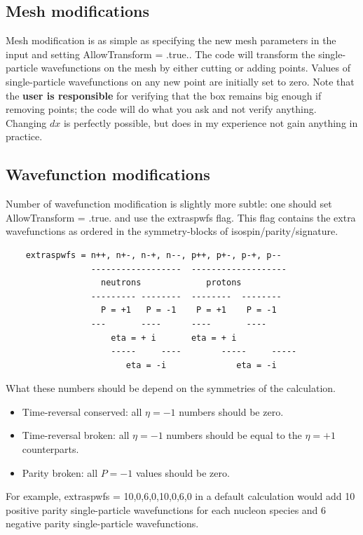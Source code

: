 \documentclass[print,amsmath,amssymb,aps,prc,nofootinbib,notitlepage]{revtex4-1}
\begin{document}
\subsection{Mesh modifications}

  Mesh modification is as simple as specifying the new mesh parameters in the
  input and setting  \textsf{AllowTransform = .true.}. The code will 
  transform the single-particle wavefunctions on the mesh by either cutting 
  or adding points. Values of single-particle wavefunctions on any new point are 
  initially set to zero. Note that the \textbf{user is responsible} for verifying 
  that the box remains big enough if removing points; the code will do what you
  ask and not verify anything. Changing $dx$ is perfectly possible, but does
  in my experience not gain anything in practice.

\subsection{Wavefunction modifications}
  
  Number of wavefunction modification is slightly more subtle: one should set
  \textsf{AllowTransform = .true.} and use the \textsf{extraspwfs} flag. 
  This flag contains the extra wavefunctions as ordered in the symmetry-blocks
  of isospin/parity/signature. 
  \begin{Verbatim}
    extraspwfs = n++, n+-, n-+, n--, p++, p+-, p-+, p--
                 ------------------  -------------------
                   neutrons             protons 
                 --------- --------  --------  --------
                   P = +1   P = -1    P = +1    P = -1
                 ---       ----      ----       ----
                     eta = + i       eta = + i
                     -----     ----        -----     -----
                        eta = -i              eta = -i
  \end{Verbatim}
  What these numbers should be depend on the symmetries of the calculation.
  \begin{itemize}
  \item Time-reversal conserved: all $\eta = -1$ numbers should be zero.
  \item Time-reversal broken: all $\eta = -1$ numbers should be equal to the $\eta=+1$ counterparts.
  \item Parity broken: all $P=-1$ values should be zero. 
  \end{itemize}
  For example, \textsf{extraspwfs = 10,0,6,0,10,0,6,0} in a default calculation
  would add 10 positive parity single-particle wavefunctions for each nucleon 
  species and 6 negative parity single-particle wavefunctions.
\end{document}
